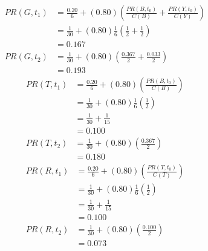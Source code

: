 \documentclass[11pt]{article}
\begin{document}
\begin{enumerate}
\begin{enumerate}
                    \begin{align*}
                        PR(G,t_{1}) & = \frac{0.20}{6}+(0.80)\left(\frac{PR(B,t_{0})}{C(B)}+\frac{PR(Y,t_{0})}{C(Y)}\right) \\
                                    & = \frac{1}{30}+(0.80)\frac{1}{6}\left(\frac{1}{2}+\frac{1}{2}\right)                  \\
                                    & = 0.167                                                                               \\
                        PR(G,t_{2}) & = \frac{1}{30}+(0.80)\left(\frac{0.367}{2}+\frac{0.033}{2}\right)                     \\
                                    & = 0.193
                    \end{align*}
                    \begin{align*}
                        PR(T,t_{1}) & = \frac{0.20}{6}+(0.80)\left(\frac{PR(B,t_{0})}{C(B)}\right) \\
                                    & = \frac{1}{30}+(0.80)\frac{1}{6}\left(\frac{1}{2}\right)     \\
                                    & = \frac{1}{30}+\frac{1}{15}                                  \\
                                    & = 0.100                                                      \\
                        PR(T,t_{2}) & = \frac{1}{30}+(0.80)\left(\frac{0.367}{2}\right)            \\
                                    & = 0.180
                    \end{align*}
                    \begin{align*}
                        PR(R,t_{1}) & = \frac{0.20}{6}+(0.80)\left(\frac{PR(T,t_{0})}{C(T)}\right) \\
                                    & = \frac{1}{30}+(0.80)\frac{1}{6}\left(\frac{1}{2}\right)     \\
                                    & = \frac{1}{30}+\frac{1}{15}                                  \\
                                    & = 0.100                                                      \\
                        PR(R,t_{2}) & = \frac{1}{30}+(0.80)\left(\frac{0.100}{2}\right)            \\
                                    & = 0.073
                    \end{align*}

\end{enumerate}
\end{enumerate}
\end{document}

